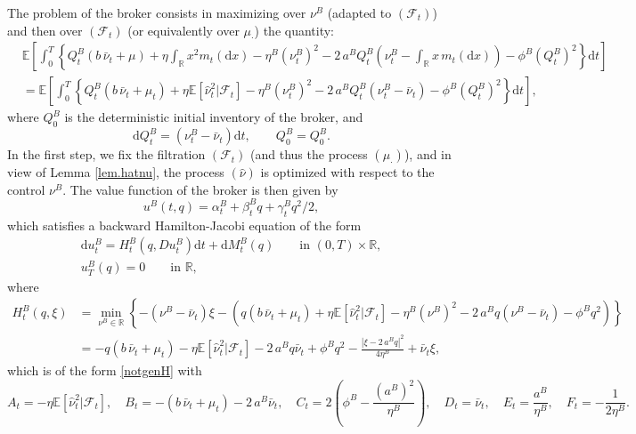 \documentclass[10pt]{article}
\def\d{\mathrm{d}}
\begin{document}
The problem of the broker consists in maximizing over $\nu^B$ (adapted to $(\mathcal{F}_t)$) and then over $(\mathcal{F}_t)$ (or equivalently over $\mu_\cdot$) the quantity:
\begin{align*}
&\mathbb{E} \left[ \int_0^T \left\{ Q^B_t \left(b\,\bar{\nu}_t  + \mu \right) + \eta \int_{\mathbb{R}} x^2 m_t(\d x) - \eta^B \left( \nu^B_t \right)^2 - 2\,a^B Q^B_t \left( \nu^B_t - \int_{\mathbb{R}} x\, m_t(\d x) \right) - \phi^B \left( Q^B_t \right)^2 \right\} \d t \right] \\
&= \mathbb{E} \left[ \int_0^T \left\{ Q^B_t \left(b\,\bar{\nu}_t  + \mu_t \right) + \eta \mathbb{E}[\hat{\nu}_t^2 | \mathcal{F}_t] - \eta^B \left( \nu^B_t \right)^2 - 2\,a^B Q^B_t \left( \nu^B_t - \bar{\nu}_t \right) - \phi^B \left( Q^B_t \right)^2 \right\} \d t \right],
\end{align*}
where $Q_0^B$ is the deterministic initial inventory of the broker, and
$$
\d Q^B_t = \left( \nu^B_t - \bar{\nu}_t \right) \d t, \qquad Q^B_0 = Q^B_0.
$$
In the first step, we fix the filtration $(\mathcal{F}_t)$ (and thus the process $(\mu_\cdot)$), and in view of Lemma \ref{lem.hatnu}, the process $(\hat{\nu})$ is optimized with respect to the control $\nu^B$. The value function of the broker is then given by 
$$
u^B(t,q) = \alpha^B_t + \beta^B_t q + \gamma^B_t q^2 / 2,
$$
which satisfies a backward Hamilton-Jacobi equation of the form
$$
\begin{array}{l}
\d u^B_t = H^B_t(q,Du^B_t)\d t + \d M^B_t(q) \qquad \text{in } (0,T) \times \mathbb{R},\\
u^B_T(q) = 0 \qquad \text{in } \mathbb{R},
\end{array}
$$
where
\begin{align*}
H^B_t(q,\xi) &= \min_{\nu^B \in \mathbb{R}} \left\{ - (\nu^B - \bar{\nu}_t) \xi - \left( q \left(b\,\bar{\nu}_t  + \mu_t \right) + \eta \mathbb{E}[\hat{\nu}_t^2 | \mathcal{F}_t] - \eta^B \left( \nu^B \right)^2 - 2\,a^B q \left( \nu^B - \bar{\nu}_t \right) - \phi^B q^2 \right) \right\} \\
&= - q \left(b\,\bar{\nu}_t  + \mu_t \right) - \eta \mathbb{E}[\hat{\nu}_t^2 | \mathcal{F}_t] - 2\,a^B q \bar{\nu}_t + \phi^B q^2 - \frac{| \xi - 2\,a^B q |^2}{4\eta^B} + \bar{\nu}_t \xi,
\end{align*}
which is of the form \eqref{notgenH} with 
$$
A_t = - \eta \mathbb{E}[\hat{\nu}_t^2 | \mathcal{F}_t], \quad B_t = - \left(b\,\bar{\nu}_t  + \mu_t \right) - 2\,a^B \bar{\nu}_t, \quad C_t = 2 \left(\phi^B - \frac{(a^B)^2}{\eta^B}\right), \quad D_t = \bar{\nu}_t, \quad E_t = \frac{a^B}{\eta^B}, \quad F_t = - \frac{1}{2\eta^B}.
$$
\end{document}
